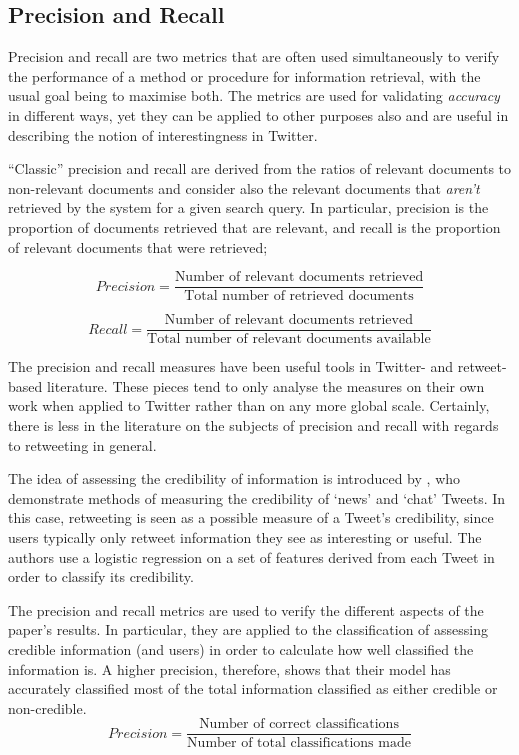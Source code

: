 \subsection{Precision and Recall}
Precision and recall are two metrics that are often used simultaneously to verify the performance of a method or procedure for information retrieval, with the usual goal being to maximise both. The metrics are used for validating \textit{accuracy} in different ways, yet they can be applied to other purposes also and are useful in describing the notion of interestingness in Twitter.

``Classic'' precision and recall are derived from the ratios of relevant documents to non-relevant documents and consider also the relevant documents that \textit{aren't} retrieved by the system for a given search query. In particular, precision is the proportion of documents retrieved that are relevant, and recall is the proportion of relevant documents that were retrieved;

\[	
	Precision = \frac{\text{Number of relevant documents retrieved}}{\text{Total number of retrieved documents}}
\]

\[
	Recall = \frac{\text{Number of relevant documents retrieved}}{\text{Total number of relevant documents available}}
\]

The precision and recall measures have been useful tools in Twitter- and retweet-based literature. These pieces tend to only analyse the measures on their own work when applied to Twitter rather than on any more global scale. Certainly, there is less in the literature on the subjects of precision and recall with regards to retweeting in general.

The idea of assessing the credibility of information is introduced by \citet{castillo11}, who demonstrate methods of measuring the credibility of `news' and `chat' Tweets. In this case, retweeting is seen as a possible measure of a Tweet's credibility, since users typically only retweet information they see as interesting or useful. The authors use a logistic regression on a set of features derived from each Tweet in order to classify its credibility. 

The precision and recall metrics are used to verify the different aspects of the paper's results. In particular, they are applied to the classification of assessing credible information (and users) in order to calculate how well classified the information is. A higher precision, therefore, shows that their model has accurately classified most of the total information classified as either credible or non-credible.
\[	
	Precision = \frac{\text{Number of correct classifications}}{\text{Number of total classifications made}}
\]

